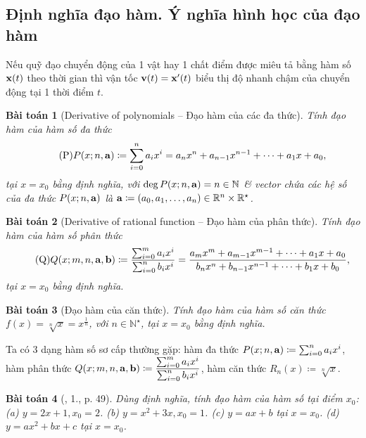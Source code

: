 \documentclass{article}
\newtheorem{baitoan}{Bài toán}
\begin{document}
\subsection{Định nghĩa đạo hàm. Ý nghĩa hình học của đạo hàm}
Nếu quỹ đạo chuyển động của 1 vật hay 1 chất điểm được miêu tả bằng hàm số ${\bf x}(t)$ theo thời gian thì vận tốc ${\bf v}(t) = {\bf x}'(t)$ biểu thị độ nhanh chậm của chuyển động tại 1 thời điểm $t$.

\begin{baitoan}[Derivative of polynomials -- Đạo hàm của các đa thức]
	Tính đạo hàm của hàm số đa thức
	\begin{equation}
		\label{polynomial}
		\tag{P}
		P(x;n,{\bf a})\coloneqq\sum_{i=0}^n a_ix^i = a_nx^n + a_{n-1}x^{n-1} + \cdots + a_1x + a_0,
	\end{equation}
	tại $x = x_0$ bằng định nghĩa, với $\deg P(x;n,{\bf a}) = n\in\mathbb{N}$ \& vector chứa các hệ số của đa thức $P(x;n,{\bf a})$ là ${\bf a}\coloneqq(a_0,a_1,\ldots,a_n)\in\mathbb{R}^n\times\mathbb{R}^\star$.
\end{baitoan}

\begin{baitoan}[Derivative of rational function -- Đạo hàm của phân thức]
	Tính đạo hàm của hàm số phân thức
	\begin{equation}
		\label{rational function}
		\tag{Q}
		Q(x;m,n,{\bf a},{\bf b})\coloneqq\frac{\sum_{i=0}^m a_ix^i}{\sum_{i=0}^n b_ix^i} = \frac{a_mx^m + a_{m-1}x^{m-1} + \cdots + a_1x + a_0}{b_nx^n + b_{n-1}x^{n-1} + \cdots + b_1x + b_0},
	\end{equation}
	tại $x = x_0$ bằng định nghĩa.
\end{baitoan}

\begin{baitoan}[Đạo hàm của căn thức]
	Tính đạo hàm của hàm số căn thức $f(x) = \sqrt[n]{x} = x^{\frac{1}{n}}$, với $n\in\mathbb{N}^\star$, tại $x = x_0$ bằng định nghĩa.
\end{baitoan}
Ta có 3 dạng hàm số sơ cấp thường gặp: hàm đa thức $P(x;n,{\bf a})\coloneqq\sum_{i=0}^n a_ix^i$, hàm phân thức $Q(x;m,n,{\bf a},{\bf b})\coloneqq\dfrac{\sum_{i=0}^m a_ix^i}{\sum_{i=0}^n b_ix^i}$, hàm căn thức $R_n(x)\coloneqq\sqrt[n]{x}$.

\begin{baitoan}[\cite{TLCT_BT_dai_so_giai_tich_11}, 1., p. 49]
	Dùng định nghĩa, tính đạo hàm của hàm số tại điểm $x_0$: (a) $y = 2x + 1,x_0 = 2$. (b) $y = x^2 + 3x,x_0 = 1$. (c) $y = ax + b$ tại $x = x_0$. (d) $y = ax^2 + bx + c$ tại $x = x_0$.
\end{baitoan}
\end{document}
